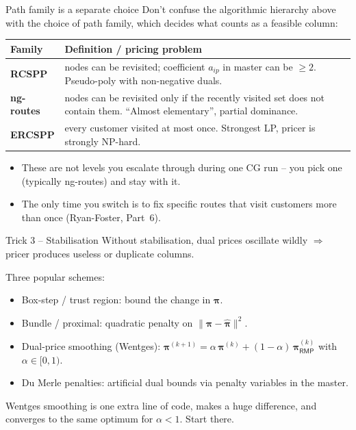 \documentclass[10pt,aspectratio=169]{beamer}
\newcommand{\rmp}{\mathsf{RMP}}
\begin{document}
\begin{frame}{Path family is a separate choice}
  Don't confuse the algorithmic hierarchy above with the choice of
  \alert{path family}, which decides what counts as a feasible column:
  \begin{tabular}{@{}p{}p{}@{}}
    \toprule
    Family & Definition / pricing problem \\
    \midrule
    \textbf{RCSPP} & nodes can be revisited; coefficient $a_{ip}$ in master
                     can be $\ge 2$. Pseudo-poly with non-negative duals. \\
    \textbf{ng-routes} & nodes can be revisited only if the recently
                     visited set does not contain them. ``Almost
                     elementary'', partial dominance. \\
    \textbf{ERCSPP} & every customer visited at most once. Strongest LP,
                     pricer is strongly NP-hard. \\
    \bottomrule
  \end{tabular}
  \medskip
  \begin{itemize}\small
    \item These are not levels you escalate through during one CG run -- you
          \alert{pick one} (typically ng-routes) and stay with it.
    \item The only time you switch is to fix specific routes that visit
          customers more than once (Ryan-Foster, Part~6).
  \end{itemize}
\end{frame}

\begin{frame}{Trick 3 -- Stabilisation}
  Without stabilisation, dual prices oscillate wildly $\Rightarrow$ pricer
  produces useless or duplicate columns.

  \medskip
  Three popular schemes:
  \begin{itemize}\small
    \item \alert{Box-step / trust region}: bound the change in $\boldsymbol\pi$.
    \item \alert{Bundle / proximal}: quadratic penalty on
          $\|\boldsymbol\pi-\hat{\boldsymbol\pi}\|^2$.
    \item \alert{Dual-price smoothing} (Wentges):
          $\boldsymbol\pi^{(k+1)} = \alpha\,\boldsymbol\pi^{(k)} + (1-\alpha)\,
          \boldsymbol\pi^{(k)}_{\rmp}$ with $\alpha\in[0,1)$.
    \item \alert{Du Merle penalties}: artificial dual bounds via penalty
          variables in the master.
  \end{itemize}

  \medskip
  \begin{keybox}
    Wentges smoothing is one extra line of code, makes a huge difference, and
    converges to the same optimum for $\alpha<1$. Start there.
  \end{keybox}
\end{frame}
\end{document}
